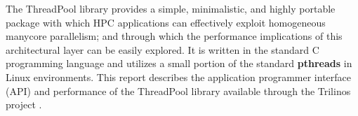 The ThreadPool library provides a simple, minimalistic, and highly portable package with which HPC applications can effectively exploit homogeneous manycore parallelism; and through which the performance implications of this architectural layer can be easily explored.
%
It is written in the standard C programming language and utilizes a small portion of the standard \textbf{pthreads} \cite{pthreads:Standard} in Linux environments.
%
This report describes the application programmer interface (API) and performance of the ThreadPool library available through the Trilinos project \cite{Trilinos:WebSite}. 



